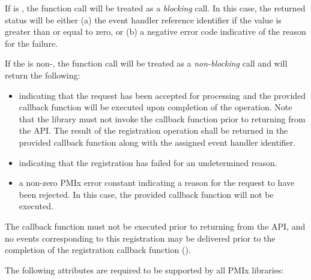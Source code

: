\begin{arglist}
\end{arglist}


If  is , the function call will be treated as a \emph{blocking} call. In this case, the returned status will be either (a) the event handler reference identifier if the value is greater than or equal to zero, or (b) a negative error code indicative of the reason for the failure.

If the  is non-, the function call will be treated as a \emph{non-blocking} call and will return the following:

\begin{itemize}
\item {} indicating that the request has been accepted for processing and the provided callback function will be executed upon completion of the operation. Note that the library must not invoke the callback function prior to returning from the \ac{API}. The result of the registration operation shall be returned in the provided callback function along with the assigned event handler identifier.
\item {} indicating that the registration
has failed for an undetermined reason.
\item a non-zero \ac{PMIx} error constant indicating a reason for the request to have been rejected. In this case, the provided callback function will not be executed.
\end{itemize}

The callback function must not be executed prior to returning from the \ac{API}, and no events corresponding to this registration may be delivered prior to the completion of the registration callback function ().

\reqattrstart
The following attributes are required to be supported by all \ac{PMIx} libraries:

